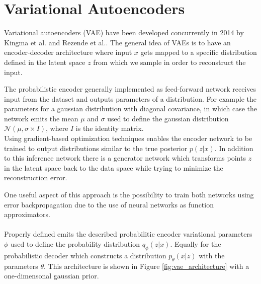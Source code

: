 \section{Variational Autoencoders}
\label{sec:vae}
Variational autoencoders (VAE) have been developed concurrently in 2014 by Kingma et al.\cite{vae:2014} and Rezende et al.\cite{dlgm:2014}.
The general idea of VAEs is to have an encoder-decoder architecture where input $x$ gets mapped to a specific distribution defined in the latent space $z$ from which we sample in order to reconstruct the input.





The probabilistic encoder generally implemented as feed-forward network receives input from the dataset and outputs parameters of a distribution. For example the parameters for a gaussian distribution with diagonal covariance, in which case the network emits the mean $\mu$ and $\sigma$ used to define the gaussian distribution $\mathcal{N}(\mu,\sigma \times I)$, where $I$ is the identity matrix.\\

Using gradient-based optimization techniques enables the encoder network to be trained to output distributions similar to the true posterior $p(z|x)$.
In addition to this inference network there is a generator network which transforms points $z$ in the latent space back to the data space while trying to minimize the reconstruction error.


One useful aspect of this approach is the possibility to train both networks using error backpropagation due to the use of neural networks as function approximators.\\\\

Properly defined emits the described probabilitic encoder variational parameters $\phi$ used to define the probability distribution $q_\phi(z|x)$.
Equally for the probabilistic decoder which constructs a distribution $p_\theta(x|z)$ with the parameters $\theta$.
This architecture is shown in Figure \ref{fig:vae_architecture} with a one-dimensonal gaussian prior.
\\


